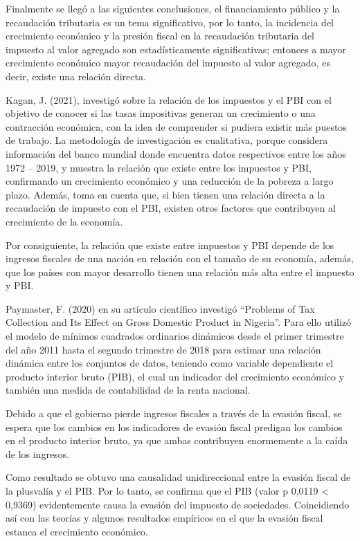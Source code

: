 \documentclass[
  letterpaper,
  DIV=11,
  numbers=noendperiod]{scrartcl}
\begin{document}
Finalmente se llegó a las siguientes conclusiones, el financiamiento
público y la recaudación tributaria es un tema significativo, por lo
tanto, la incidencia del crecimiento económico y la presión fiscal en la
recaudación tributaria del impuesto al valor agregado son
estadísticamente significativas; entonces a mayor crecimiento económico
mayor recaudación del impuesto al valor agregado, es decir, existe una
relación directa.

Kagan, J. (2021), investigó sobre la relación de los impuestos y el PBI
con el objetivo de conocer si las tasas impositivas generan un
crecimiento o una contracción económica, con la idea de comprender si
pudiera existir más puestos de trabajo. La metodología de investigación
es cualitativa, porque considera información del banco mundial donde
encuentra datos respectivos entre los años 1972 -- 2019, y muestra la
relación que existe entre los impuestos y PBI, confirmando un
crecimiento económico y una reducción de la pobreza a largo plazo.
Además, toma en cuenta que, si bien tienen una relación directa a la
recaudación de impuesto con el PBI, existen otros factores que
contribuyen al crecimiento de la economía.

Por consiguiente, la relación que existe entre impuestos y PBI depende
de los ingresos fiscales de una nación en relación con el tamaño de su
economía, además, que los países con mayor desarrollo tienen una
relación más alta entre el impuesto y PBI.

Paymaster, F. (2020) en su artículo científico investigó ``Problems of
Tax Collection and Its Effect on Gross Domestic Product in Nigeria''.
Para ello utilizó el modelo de mínimos cuadrados ordinarios dinámicos
desde el primer trimestre del año 2011 hasta el segundo trimestre de
2018 para estimar una relación dinámica entre los conjuntos de datos,
teniendo como variable dependiente el producto interior bruto (PIB), el
cual un indicador del crecimiento económico y también una medida de
contabilidad de la renta nacional.

Debido a que el gobierno pierde ingresos fiscales a través de la evasión
fiscal, se espera que los cambios en los indicadores de evasión fiscal
predigan los cambios en el producto interior bruto, ya que ambas
contribuyen enormemente a la caída de los ingresos.

Como resultado se obtuvo una causalidad unidireccional entre la evasión
fiscal de la plusvalía y el PIB. Por lo tanto, se confirma que el PIB
(valor p 0,0119 \textless{} 0,9369) evidentemente causa la evasión del
impuesto de sociedades. Coincidiendo así con las teorías y algunos
resultados empíricos en el que la evasión fiscal estanca el crecimiento
económico.
\end{document}
